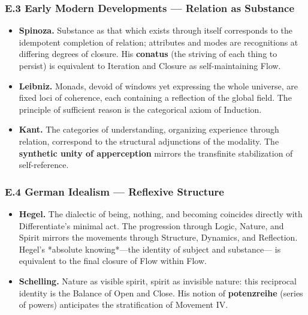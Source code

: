 \documentclass[11pt]{article}
\begin{document}
\subsubsection*{E.3 Early Modern Developments — Relation as Substance}
\label{sec:orgbd1e5e3}
\begin{itemize}
\item \textbf{\textbf{Spinoza.}}  
Substance as that which exists through itself corresponds  
to the idempotent completion of relation;  
attributes and modes are recognitions at differing degrees of closure.  
His \textbf{conatus} (the striving of each thing to persist)  
is equivalent to Iteration and Closure as self-maintaining Flow.

\item \textbf{\textbf{Leibniz.}}  
Monads, devoid of windows yet expressing the whole universe,  
are fixed loci of coherence, each containing a reflection of the global field.  
The principle of sufficient reason is the categorical axiom of Induction.

\item \textbf{\textbf{Kant.}}  
The categories of understanding, organizing experience through relation,  
correspond to the structural adjunctions of the modality.  
The \textbf{synthetic unity of apperception} mirrors  
the transfinite stabilization of self-reference.
\end{itemize}
\subsubsection*{E.4 German Idealism — Reflexive Structure}
\label{sec:org4c7d9ca}
\begin{itemize}
\item \textbf{\textbf{Hegel.}}  
The dialectic of being, nothing, and becoming  
coincides directly with Differentiate’s minimal act.  
The progression through Logic, Nature, and Spirit  
mirrors the movements through Structure, Dynamics, and Reflection.  
Hegel’s *absolute knowing*—the identity of subject and substance—  
is equivalent to the final closure of Flow within Flow.

\item \textbf{\textbf{Schelling.}}  
Nature as visible spirit, spirit as invisible nature:  
this reciprocal identity is the Balance of Open and Close.  
His notion of \textbf{potenzreihe} (series of powers)  
anticipates the stratification of Movement IV.
\end{itemize}
\end{document}
